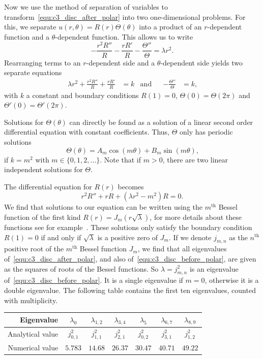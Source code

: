 Now we use the method of separation of variables to transform~\eqref{equ:c3_disc_after_polar} into two one-dimensional problems. For this, we separate $u(r, \theta) = R(r) \Theta(\theta)$ into a product of an $r$-dependent function and a $\theta$-dependent function. This allows us to write
$$
  -\frac{r^2 R''}{R} - \frac{rR'}{R} - \frac{\Theta''}{\Theta} = \lambda r^2 \text{.}
$$
Rearranging terms to an $r$-dependent side and a $\theta$-dependent side yields two separate equations
\begin{align*}
  \lambda r^2 + \frac{r^2 R''}{R} + \frac{rR'}{R} & = k & \text{and} &  & -\frac{\Theta''}{\Theta} & = k\text{,}
\end{align*}
with $k$ a constant and boundary conditions $R(1) = 0$, $\Theta(0) = \Theta(2\pi)$ and $\Theta'(0) = \Theta'(2\pi)$.

Solutions for $\Theta(\theta)$ can directly be found as a solution of a linear second order differential equation with constant coefficients. Thus, $\Theta$ only has periodic solutions
$$
  \Theta(\theta) = A_m \cos(m\theta) + B_m \sin(m\theta)\text{,}
$$
if $k = m^2$ with $m \in \{0, 1, 2, \dots\}$. Note that if $m > 0$, there are two linear independent solutions for $\Theta$.

The differential equation for $R(r)$ becomes
$$
  r^2 R'' + r R + (\lambda r^2 - m^2)R = 0\text{.}
$$
We find that solutions to our equation can be written using the $m^\text{th}$ Bessel function of the first kind $R(r) = J_m(r \sqrt{\lambda})$, for more details about these functions see for example~\cite[section~4.7]{asmar_partial_2005}. These solutions only satisfy the boundary condition $R(1) = 0$ if and only if $\sqrt{\lambda}$ is a positive zero of $J_m$. If we denote $j_{m, n}$ as the $n^\text{th}$ positive root of the $m^\text{th}$ Bessel function $J_m$, we find that all eigenvalues of~\eqref{equ:c3_disc_after_polar}, and also of~\eqref{equ:c3_disc_before_polar}, are given as the squares of roots of the Bessel functions. So $\lambda = j_{m, n}^2$ is an eigenvalue of~\eqref{equ:c3_disc_before_polar}. It is a single eigenvalue if $m = 0$, otherwise it is a double eigenvalue. The following table contains the first ten eigenvalues, counted with multiplicity.

\begin{center}
  \bgroup
  \def\arraystretch{1.5}
  \begin{tabular}{r|cccccc}
    Eigenvalue       & $\lambda_0$ & $\lambda_{1,2}$ & $\lambda_{3,4}$ & $\lambda_{5}$ & $\lambda_{6,7}$ & $\lambda_{8,9}$ \\ \hline\hline
    Analytical value & $j_{0,1}^2$ & $j_{1,1}^2$     & $j_{2,1}^2$     & $j_{0,2}^2$   & $j_{3,1}^2$     & $j_{1,2}^2$     \\ \hline
    Numerical value  & $5.783$     & $14.68$         & $26.37$         & $30.47$       & $40.71$         & $49.22$
  \end{tabular}
  \egroup
\end{center}

